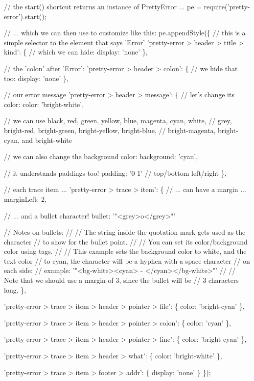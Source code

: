 \begin{DoxyCode}
// the start() shortcut returns an instance of PrettyError ...
pe = require('pretty-error').start();

// ... which we can then use to customize like this:
pe.appendStyle(\{
   // this is a simple selector to the element that says 'Error'
   'pretty-error > header > title > kind': \{
      // which we can hide:
      display: 'none'
   \},

   // the 'colon' after 'Error':
   'pretty-error > header > colon': \{
      // we hide that too:
      display: 'none'
   \},

   // our error message
   'pretty-error > header > message': \{
      // let's change its color:
      color: 'bright-white',

      // we can use black, red, green, yellow, blue, magenta, cyan, white,
      // grey, bright-red, bright-green, bright-yellow, bright-blue,
      // bright-magenta, bright-cyan, and bright-white

      // we can also change the background color:
      background: 'cyan',

      // it understands paddings too!
      padding: '0 1' // top/bottom left/right
   \},

   // each trace item ...
   'pretty-error > trace > item': \{
      // ... can have a margin ...
      marginLeft: 2,

      // ... and a bullet character!
      bullet: '"<grey>o</grey>"'

      // Notes on bullets:
      //
      // The string inside the quotation mark gets used as the character
      // to show for the bullet point.
      //
      // You can set its color/background color using tags.
      //
      // This example sets the background color to white, and the text color
      // to cyan, the character will be a hyphen with a space character
      // on each side:
      // example: '"<bg-white><cyan> - </cyan></bg-white>"'
      //
      // Note that we should use a margin of 3, since the bullet will be
      // 3 characters long.
   \},

   'pretty-error > trace > item > header > pointer > file': \{
      color: 'bright-cyan'
   \},

   'pretty-error > trace > item > header > pointer > colon': \{
      color: 'cyan'
   \},

   'pretty-error > trace > item > header > pointer > line': \{
      color: 'bright-cyan'
   \},

   'pretty-error > trace > item > header > what': \{
      color: 'bright-white'
   \},

   'pretty-error > trace > item > footer > addr': \{
      display: 'none'
   \}
\});
\end{DoxyCode}


